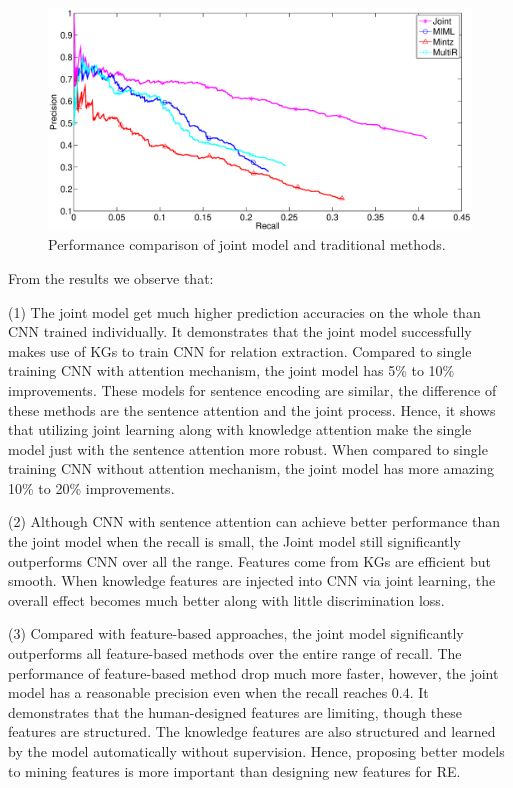 \documentclass[11pt,a4paper]{article}
\begin{document}
\begin{figure}[h]
\centering
\includegraphics[width=1\columnwidth]{jointbase.eps}
\caption{Performance comparison of joint model and traditional methods.}
\label{fig:jointbase}
\end{figure} 

From the results we observe that: 

(1) The joint model get much higher prediction accuracies on the whole than CNN trained individually. It demonstrates that the joint model successfully makes use of KGs to train CNN for relation extraction. Compared to single training CNN with attention mechanism, the joint model has 5\% to 10\% improvements. These models for sentence encoding are similar, the difference of these methods are the sentence attention and the joint process. Hence, it shows that utilizing joint learning along with knowledge attention make the single model just with the sentence attention more robust. When compared to single training CNN without attention mechanism, the joint model has more amazing 10\% to 20\% improvements.

(2) Although CNN with sentence attention can achieve better performance than the joint model when the recall is small, the Joint model still significantly outperforms CNN over all the range. Features come from KGs are efficient but smooth. When knowledge features are injected into CNN via joint learning, the overall effect becomes much better along with little discrimination loss. 

(3) Compared with feature-based approaches, the joint model significantly outperforms all feature-based methods over the entire range of recall. The performance of feature-based method drop much more faster, however, the joint model has a reasonable precision even when the recall reaches $0.4$. It demonstrates that the human-designed features are limiting, though these features are structured. The knowledge features are also structured and learned by the model automatically without supervision. Hence, proposing better models to mining features is more important than designing new features for RE.
\end{document}
